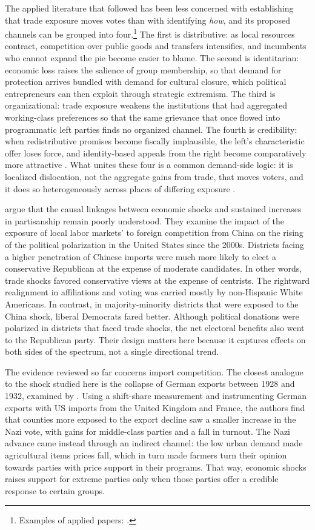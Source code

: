 \documentclass[
	11pt,				%
	oneside,			%
	a4paper,			%
	english,			%
	english				%
	]{abntex2ppgsi}
\theoremstyle{plain}
\theoremstyle{remark}
\theoremstyle{plain}%
\theoremstyle{remark}%
\begin{document}
The applied literature that followed has been less concerned with establishing that trade exposure moves votes than with identifying \emph{how}, and its
proposed channels can be grouped into four.\footnote{Examples of applied papers: .} The first is distributive: as local resources contract, competition over public goods and transfers intensifies, and incumbents who cannot expand the pie become easier to blame. The second is identitarian: economic loss raises the salience of group membership, so that demand for protection arrives bundled with demand for cultural closure, which political entrepreneurs can then exploit through strategic extremism. The third is organizational: trade exposure weakens the institutions that had aggregated working-class preferences so that the same grievance that once flowed into programmatic left parties finds no organized channel. The fourth is credibility: when redistributive promises become fiscally implausible, the left's characteristic offer loses force, and identity-based appeals from the right become comparatively more attractive \cite{colantone,Margalit}. What unites these four is a common demand-side logic: it is localized dislocation, not the aggregate gains from trade, that moves voters, and it does so heterogeneously across places of differing exposure \cite{rodrikQA}. 


 argue that the causal linkages between economic shocks and sustained increases in partisanship remain poorly understood. They examine the impact of the exposure of local labor markets’ to foreign competition from China on the rising of the political polarization in the United States since the 2000s. Districts facing a higher penetration of Chinese imports were much more likely to elect a conservative Republican at the expense of moderate candidates. In other words, trade shocks favored conservative views at the expense of centrists. The rightward realignment in affiliations and voting was carried mostly by non-Hispanic White Americans. In contrast, in majority-minority districts that were exposed to the China shock, liberal Democrats fared better. Although political donations were polarized in districts that faced trade shocks, the net electoral benefits also went to the Republican party. Their design matters here because it captures effects on both sides of the spectrum, not a single directional trend.

The evidence reviewed so far concerns import competition. The closest analogue to the shock studied here is the collapse of German exports between 1928 and 1932, examined by . Using a shift-share measurement and instrumenting German exports with US imports from the United Kingdom and France, the authors find that counties more exposed to the export decline saw a smaller increase in the Nazi vote, with gains for middle-class parties and a fall in turnout. The Nazi advance came instead through an indirect channel: the low urban demand made agricultural items prices fall, which in turn made farmers turn their opinion towards parties with price support in their programs. That way, economic shocks raises support for extreme parties only when those parties offer a credible response to certain groups. 
\end{document}
